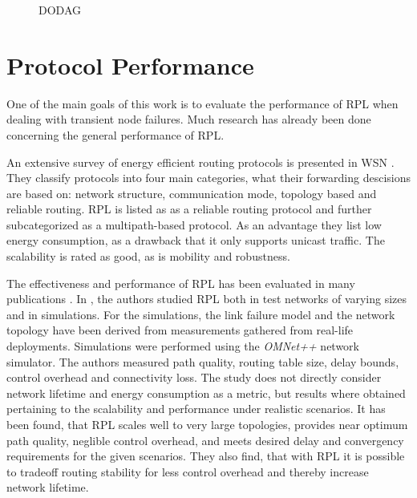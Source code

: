 \begin{figure}[h]
  \centering
  \caption{\acf{DODAG}}
  \label{fig:dodag}
\end{figure}

\section{Protocol Performance}

One of the main goals of this work is to evaluate the performance of \ac{RPL} when dealing with transient node failures.
Much research has already been done concerning the general performance of \ac{RPL}.

An extensive survey of energy efficient routing protocols is presented in \ac{WSN} \cite{pantazis2013energy}.
They classify protocols into four main categories, what their forwarding descisions are based on: network structure, communication mode, topology based and reliable routing.
\ac{RPL} is listed as as a reliable routing protocol and further subcategorized as a multipath-based protocol.
As an advantage they list low energy consumption, as a drawback that it only supports unicast traffic.
The scalability is rated as good, as is mobility and robustness.

The effectiveness and performance of \ac{RPL} has been evaluated in many publications \cite{rfc6687,accettura2011performance,korte2012study,ali2012performance,banh2015performance}.
In \cite{rfc6687}, the authors studied \ac{RPL} both in test networks of varying sizes and in simulations.
For the simulations, the link failure model and the network topology have been derived from measurements gathered from real-life deployments.
Simulations were performed using the \emph{OMNet++} \cite{varga2008overview} network simulator.
The authors measured path quality, routing table size, delay bounds, control overhead and connectivity loss.
The study does not directly consider network lifetime and energy consumption as a metric, but results where obtained pertaining to the scalability and performance under realistic scenarios.
It has been found, that \ac{RPL} scales well to very large topologies, provides near optimum path quality, neglible control overhead, and meets desired delay and convergency requirements for the given scenarios.
They also find, that with \ac{RPL} it is possible to tradeoff routing stability for less control overhead and thereby increase network lifetime.

